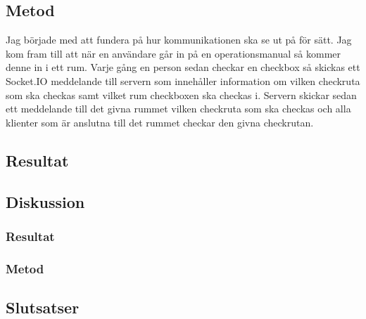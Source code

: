 \subsection{Metod}
Jag började med att fundera på hur kommunikationen ska se ut på för sätt. Jag kom fram till att när en användare går in på en operationsmanual så kommer denne in i ett rum. Varje gång en person sedan checkar en checkbox så skickas ett Socket.IO meddelande till servern som innehåller information om vilken checkruta som ska checkas samt vilket rum checkboxen ska checkas i. Servern skickar sedan ett meddelande till det givna rummet vilken checkruta som ska checkas och alla klienter som är anslutna till det rummet checkar den givna checkrutan.

\subsection{Resultat}
\subsection{Diskussion}
\subsubsection{Resultat}
\subsubsection{Metod}
\subsection{Slutsatser}
